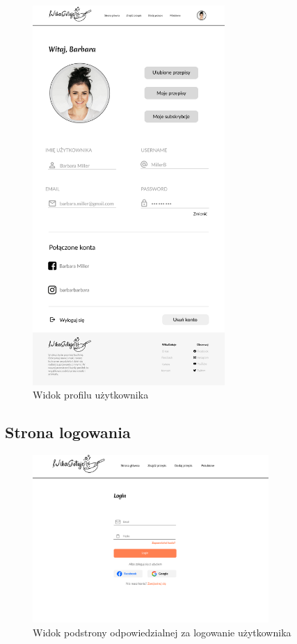 \documentclass{article}
\begin{document}
\begin{figure}[H]
    \begin{center}
        \includegraphics[width=0.65\textwidth]{mockups/user_profile}
    \end{center}
    \caption{Widok profilu użytkownika}
\end{figure}
\newpage

\subsection{Strona logowania}

\begin{figure}[H]
    \begin{center}
        \includegraphics[width=0.8\textwidth]{mockups/login_page}
    \end{center}
    \caption{Widok podstrony odpowiedzialnej za logowanie użytkownika}
    \label{fig:login_page}
\end{figure}
\end{document}
